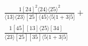 \documentclass[varwidth, border=5pt]{standalone}
\begin{document}
\begin{my}
$\begin{gathered}
\scriptscriptstyle\frac{1[24]^2⟨24⟩⟨25⟩^2}{⟨13⟩⟨23⟩[25]⟨45⟩⟨5|1+3|5]}+\\
\scriptscriptstyle\frac{1[45][13]⟨25⟩[34]}{⟨23⟩[25][35]⟨5|1+3|5]}\phantom{+}
\end{gathered}$
\end{my}
\end{document}
